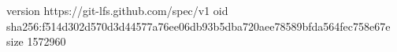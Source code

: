 version https://git-lfs.github.com/spec/v1
oid sha256:f514d302d570d3d44577a76ee06db93b5dba720aee78589bfda564fec758e67e
size 1572960
